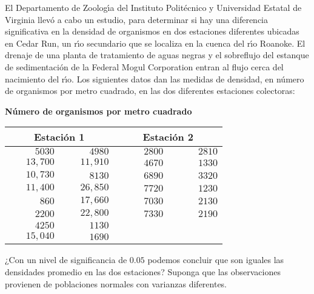 \begin{enunciado}
 El Departamento de Zoolog\'{\i}a del Instituto Polit\'ecnico y Universidad Estatal de Virginia llev\'o a cabo un estudio, para determinar si hay una diferencia significativa en la densidad de organismos en dos estaciones diferentes ubicadas en Cedar Run, un r\'{\i}o secundario que se localiza en la cuenca del r\'{\i}o Roanoke. El drenaje de una planta de tratamiento de aguas negras y el sobreflujo del estanque de sedimentaci\'on de la Federal Mogul Corporation entran al flujo cerca del nacimiento del r\'{\i}o. Los siguientes datos dan las medidas de densidad, en n\'umero de organismos por metro cuadrado, en las dos diferentes estaciones colectoras:
 \begin{center}
  \textbf{N\'umero de organismos por metro cuadrado} \\
  \begin{tabular}{rr|rr}
   \hline
   \multicolumn{2}{c}{$\phantom{00000}$\textbf{Estaci\'on 1}$\phantom{00000}$} & \multicolumn{2}{c}{$\phantom{00000}$\textbf{Estaci\'on 2}$\phantom{00000}$} \\
   \hline 
   $5030$ & $4980$ & $2800$ & $2810$ \\
   $13,700$ & $11,910$ & $4670$ & $1330$ \\
   $10,730$ & $8130$ & $6890$ & $3320$ \\
   $11,400$ & $26,850$ & $7720$ & $1230$ \\
   $860$ & $17,660$ & $7030$ & $2130$ \\
   $2200$ & $22,800$ & $7330$ & $2190$ \\
   $4250$ & $1130$ & & \\
   $15,040$ & $1690$ & &
  \end{tabular}
 \end{center}
 ¿Con un nivel de significancia de $0.05$ podemos concluir que son iguales las densidades promedio en las dos estaciones? Suponga que las observaciones provienen de poblaciones normales con varianzas diferentes.
\end{enunciado}

